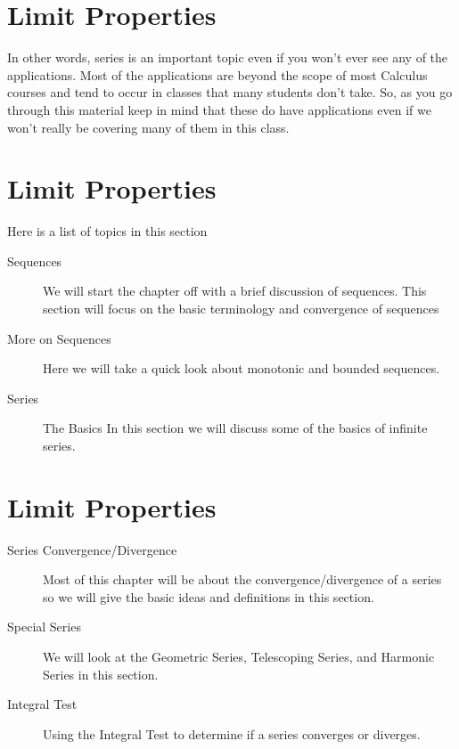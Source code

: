 \documentclass{beamer}
\begin{document}
	
	\section{Limit Properties}
	
	In other words, series is an important topic even if you won’t ever see any of the applications.  Most of the applications are beyond the scope of most Calculus courses and tend to occur in classes that many students don’t take.  So, as you go through this material keep in mind that these do have applications even if we won’t really be covering many of them in this class.
	
	
	
	\section{Limit Properties}
	
	Here is a list of topics in this section
	
	\begin{description}
		\item[Sequences ] We will start the chapter off with a brief discussion of sequences.  This section will focus on the basic terminology and convergence of sequences
		
		\item[More on Sequences]  Here we will take a quick look about monotonic and bounded sequences.
		
		\item[Series]  The Basics  In this section we will discuss some of the basics of infinite series.
	\end{description}
	
	
	\section{Limit Properties}
	
	\begin{description}
		\item[Series Convergence/Divergence]  Most of this chapter will be about the convergence/divergence of a series so we will give the basic ideas and definitions in this section.
		
		\item[Special Series]  We will look at the Geometric Series, Telescoping Series, and Harmonic Series in this section.
		
		\item[Integral Test]  Using the Integral Test to determine if a series converges or diverges.
	\end{description}
	
\end{document}
